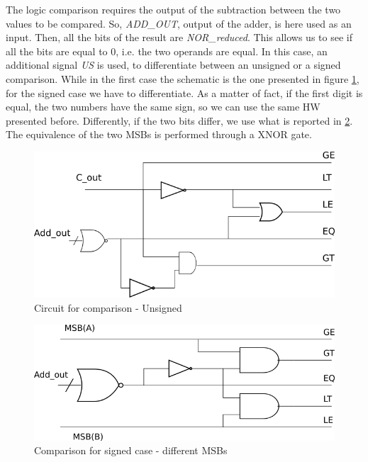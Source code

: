 The logic comparison requires the output of the subtraction between the two values to be compared. So, \textit{ADD\_OUT}, output of the adder, is here used as an input. Then, all the bits of the result are \textit{NOR\_reduced}. This allows us to see if all the bits are equal to $0$, i.e. the two operands are equal.
In this case, an additional signal \textit{US} is used, to differentiate between an unsigned or a signed comparison. While in the first case the schematic is the one presented in figure \ref{comp_us_fig}, for the signed case we have to differentiate. As a matter of fact, if the first digit is equal, the two numbers have the same sign, so we can use the same HW presented before. Differently, if the two bits differ, we use what is reported in \ref{comp_s_fig}. The equivalence of the two MSBs is performed through a \textsf{XNOR} gate. 


\begin{figure}
	\centering
	\includegraphics[scale=0.6]{chapters/figures/comp_us}
	\caption{Circuit for comparison - Unsigned}
	\label{comp_us_fig}
\end{figure}


\begin{figure}
	\centering
	\includegraphics[scale=0.6]{chapters/figures/comp_s1}
	\caption{Comparison for signed case - different MSBs}
	\label{comp_s_fig}
\end{figure}

